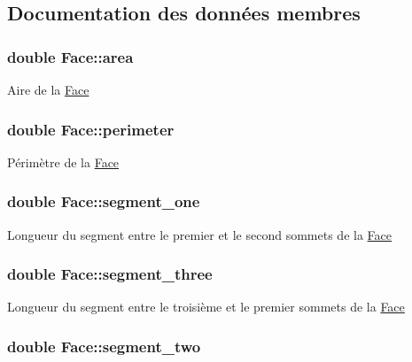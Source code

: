 \subsection{Documentation des données membres}
\hypertarget{class_face_ae63fcd017fcd355e212a2510209db17c}{
\subsubsection[{area}]{\setlength{\rightskip}{0pt plus 5cm}double Face\-::area\hspace{0.3cm}{\ttfamily [private]}}}\label{class_face_ae63fcd017fcd355e212a2510209db17c}
Aire de la \hyperlink{class_face}{Face} \hypertarget{class_face_a9b759ee3c90c67bc7af3969546f568f9}{
\subsubsection[{perimeter}]{\setlength{\rightskip}{0pt plus 5cm}double Face\-::perimeter\hspace{0.3cm}{\ttfamily [private]}}}\label{class_face_a9b759ee3c90c67bc7af3969546f568f9}
Périmètre de la \hyperlink{class_face}{Face} \hypertarget{class_face_ae4053947c53549d2fd5cf43aa9c712f4}{
\subsubsection[{segment\-\_\-one}]{\setlength{\rightskip}{0pt plus 5cm}double Face\-::segment\-\_\-one\hspace{0.3cm}{\ttfamily [private]}}}\label{class_face_ae4053947c53549d2fd5cf43aa9c712f4}
Longueur du segment entre le premier et le second sommets de la \hyperlink{class_face}{Face} \hypertarget{class_face_a777ca579978d8d20c6e8a5e64a6999cc}{
\subsubsection[{segment\-\_\-three}]{\setlength{\rightskip}{0pt plus 5cm}double Face\-::segment\-\_\-three\hspace{0.3cm}{\ttfamily [private]}}}\label{class_face_a777ca579978d8d20c6e8a5e64a6999cc}
Longueur du segment entre le troisième et le premier sommets de la \hyperlink{class_face}{Face} \hypertarget{class_face_ae79107e53090d0a7efb5070ea093a70e}{
\subsubsection[{segment\-\_\-two}]{\setlength{\rightskip}{0pt plus 5cm}double Face\-::segment\-\_\-two\hspace{0.3cm}{\ttfamily [private]}}}\label{class_face_ae79107e53090d0a7efb5070ea093a70e}
